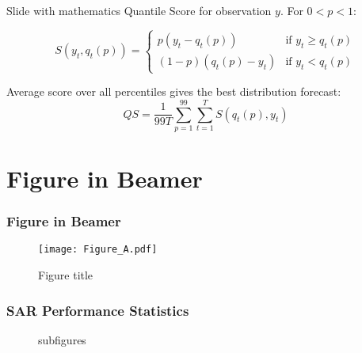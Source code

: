 \begin{frame}{Slide with mathematics}
    Quantile Score for observation $y$.   For $0<p<1$:
    \begin{block}{}
      \[
        S(y_t,q_t(p)) = \left\{
        \begin{array}{rl}
        p(y_t-q_t(p)) & \text{if $y_t \ge q_t(p)$}\\
        (1-p)(q_t(p)-y_t) & \text{if $y_t < q_t(p)$}
        \end{array}\right.
      \]
    \end{block}
   Average score over all percentiles gives the best distribution forecast:
      \[
      QS = \frac{1}{99T}\sum_{p=1}^{99}\sum_{t=1}^T S(q_t(p),y_t)
      \]
\end{frame}

\section{Figure in Beamer}
\begin{frame}
\frametitle{Figure in Beamer}
	\begin{figure}
		\texttt{[image: Figure\_A.pdf]}
		\caption{Figure title}
	\end{figure}
\end{frame}

\begin{frame}
\frametitle{SAR Performance Statistics}
    \begin{figure}[H]
        \centering
        \hspace{0.05\linewidth}
        \caption{subfigures}
    \end{figure}
\end{frame}